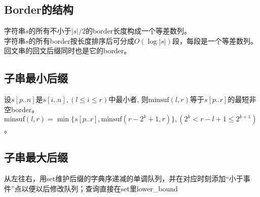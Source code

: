     \subsection*{Border的结构}
        字符串$ s $的所有不小于$ \left|s\right| / 2 $的border长度构成一个等差数列。
        \\字符串$ s $的所有border按长度排序后可分成$ O(\log \left| s \right|) $段，每段是一个等差数列。
        \\回文串的回文后缀同时也是它的border。
    \subsection*{子串最小后缀}
        设$ s[p..n] $是$ s[i..n], (l \leq i \leq r) $中最小者, 则$ \text{minsuf}(l, r) $等于$ s[p..r] $的最短非空border。$ \text{minsuf}(l, r) = \min \lbrace s[p..r], \text{minsuf}(r - 2^k + 1, r) \rbrace, (2^k < r - l + 1 \leq 2^{k + 1} ) $。
    \subsection*{子串最大后缀}
        从左往右，用set维护后缀的字典序递减的单调队列，并在对应时刻添加“小于事件”点以便以后修改队列；查询直接在set里lower\_bound

